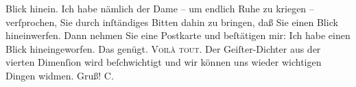                     Blick hinein. Ich habe nämlich der Dame – um endlich Ruhe zu kriegen –
                    verſprochen, Sie durch inſtändiges Bitten dahin zu bringen, daß Sie einen Blick
                    hineinwerfen. Dann nehmen Sie eine Postkarte und beſtätigen mir: Ich habe einen
                    Blick hineingeworfen. Das genügt. \textsc{Voilà tout}. Der
                    Geiſter-Dichter aus der vierten Dimenſion wird beſchwichtigt und wir können uns
                    wieder wichtigen Dingen widmen. Gruß! \spacefill\mbox{C.}\pend
           \endnumbering{}  
      